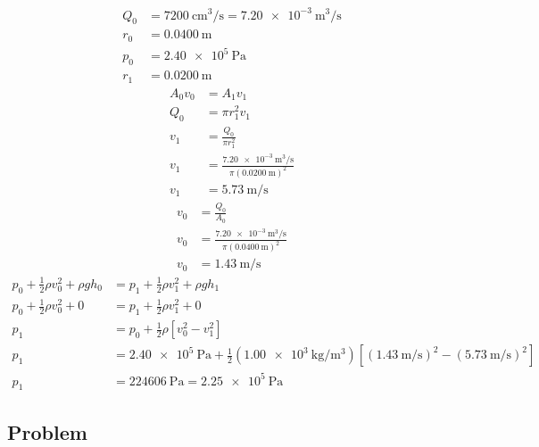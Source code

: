 \documentclass{article}
\begin{document}
\begin{align*}
	Q_0 & = \SI{7200}{\centi \meter \cubed \per \second} = \SI{7.20e-3}{\meter \cubed \per \second} \\
	r_0 & = \SI{0.0400}{\meter} \\
	p_0 & = \SI{2.40e5}{\pascal} \\
	r_1 & = \SI{0.0200}{\meter}
\end{align*}
\begin{align*}
	A_0v_0 & = A_1v_1 \\
	Q_0 & = \pi r_1^2 v_1 \\
	v_1 & = \frac{ Q_0 }{ \pi r_1^2 } \\
	v_1 & = \frac{ \SI{7.20e-3}{\meter \cubed \per \second} }{ \pi (\SI{0.0200}{\meter})^2 } \\
	v_1 & = \SI{5.73}{\meter \per \second}
\end{align*}
\begin{align*}
	v_0 & = \frac{ Q_0 }{ A_0 } \\
	v_0 & = \frac{ \SI{7.20e-3}{\meter \cubed \per \second} }{ \pi (\SI{0.0400}{\meter})^2 } \\
	v_0 & = \SI{1.43}{\meter \per \second}
\end{align*}
\begin{align*}
	p_0 + \frac{1}{2}\rho v_0^2 + \rho gh_0 & = p_1 + \frac{1}{2}\rho v_1^2 + \rho gh_1 \\
	p_0 + \frac{1}{2}\rho v_0^2 + 0 & = p_1 + \frac{1}{2}\rho v_1^2 + 0 \\
	p_1 & = p_0 + \frac{1}{2}\rho \left[ v_0^2 - v_1^2 \right] \\
	p_1 & = \SI{2.40e5}{\pascal} + \frac{1}{2}(\SI{1.00e3}{\kilogram \per \meter \cubed}) \left[ (\SI{1.43}{\meter \per \second})^2 - (\SI{5.73}{\meter \per \second})^2 \right] \\
	p_1 & = \SI{224606}{\pascal} = \SI{2.25e5}{\pascal}
\end{align*}

\subsection{Problem}
\end{document}
